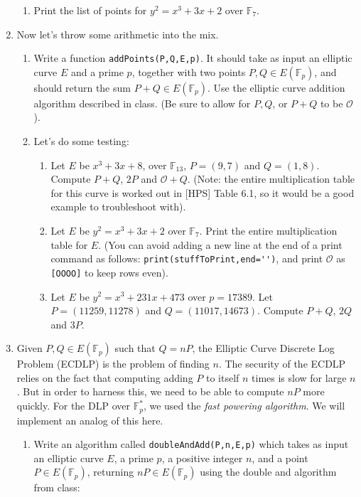 \documentclass[11pt]{article}
\newcommand{\bF}{\mathbb{F}}
\newcommand{\cO}{\mathcal{O}}
\begin{document}
\begin{enumerate}
{\begin{enumerate}
{\begin{enumerate}
    \end{enumerate}
    }
    \item{
    Print the list of points for $y^2 = x^3 + 3x + 2$ over $\bF_7$.
    }
  \end{enumerate}
  }
  \item{
  Now let's throw some arithmetic into the mix.
  \begin{enumerate}
    \item{
    Write a function \verb|addPoints(P,Q,E,p)|.  It should take as input an elliptic curve $E$ and a prime $p$, together with two points $P,Q\in E(\bF_p)$, and should return the sum $P+Q\in E(\bF_p)$.  Use the elliptic curve addition algorithm described in class.  (Be sure to allow for $P,Q$, or $P+Q$ to be $\cO$).
    }
    \item{
    Let's do some testing:
    \begin{enumerate}
      \item{
      Let $E$ be $x^3 + 3x + 8$, over $\bF_{13}$,  $P=(9,7)$ and $Q = (1,8)$.  Compute $P+Q$, $2P$ and $\cO+Q$.  (Note: the entire multiplication table for this curve is worked out in [HPS] Table 6.1, so it would be a good example to troubleshoot with).
      }
      \item{
      Let $E$ be $y^2 = x^3 + 3x + 2$ over $\bF_7$.  Print the entire multiplication table for $E$.  (You can avoid adding a new line at the end of a print command as follows: \verb|print(stuffToPrint,end='')|, and print $\cO$ as \verb|[OOOO]| to keep rows even).
      }
      \item{
      Let $E$ be $y^2 = x^3 + 231x + 473$ over $p=17389$.  Let $P = (11259,11278)$ and $Q = (11017,14673)$.  Compute $P+Q$, $2Q$ and $3P$.
      }
    \end{enumerate}
    }
  \end{enumerate}
  }
  \item{
  Given $P,Q\in E(\bF_p)$ such that $Q = nP$, the Elliptic Curve Discrete Log Problem (ECDLP) is the problem of finding $n$.  The security of the ECDLP relies on the fact that computing adding $P$ to itself $n$ times is slow for large $n$.  But in order to harness this, we need to be able to compute $nP$ more quickly.  For the DLP over $\bF_p^*$, we used the \textit{fast powering algorithm}.  We will implement an analog of this here.
  \begin{enumerate}
    \item{
    Write an algorithm called \verb|doubleAndAdd(P,n,E,p)| which takes as input an elliptic curve $E$, a prime $p$, a positive integer $n$, and a point $P\in E(\bF_p)$, returning $nP\in E(\bF_p)$ using the double and algorithm from class:
}
\end{enumerate}}
\end{enumerate}
\end{document}
